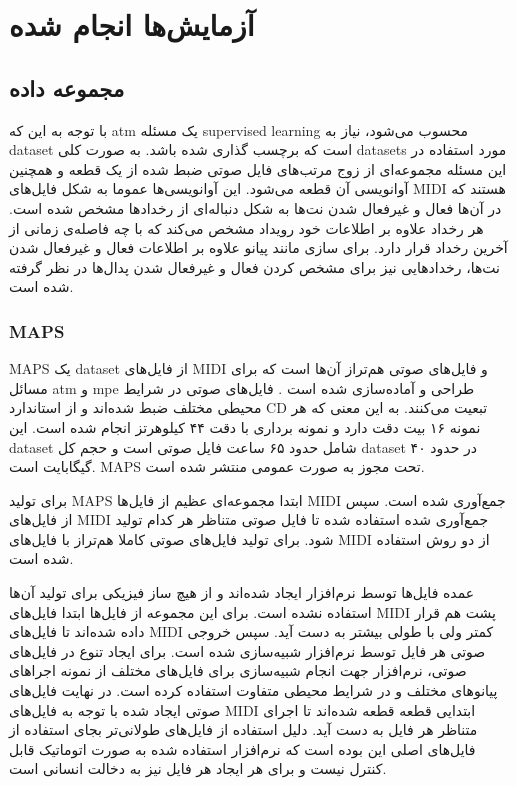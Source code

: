 \chapter{آزمایش‌ها انجام شده}
\section{مجموعه داده}
با توجه به این که \gls{atm} یک مسئله \gls{supervised learning} محسوب می‌شود،
نیاز به \gls{dataset} است که برچسب گذاری شده باشد. به صورت کلی \glspl{dataset}
مورد استفاده در این مسئله مجموعه‌ای از زوج مرتب‌های فایل صوتی ضبط شده از یک قطعه
و همچنین آوانویسی آن قطعه می‌شود. این آوانویسی‌ها عموما به شکل فایل‌های
\gls{MIDI} هستند که در آن‌ها فعال و غیرفعال شدن نت‌ها به شکل دنباله‌ای از
رخدادها مشخص شده است. هر رخداد علاوه بر اطلاعات خود رویداد مشخص می‌کند که با چه
فاصله‌ی زمانی از آخرین رخداد قرار دارد. برای سازی مانند پیانو علاوه بر اطلاعات
فعال و غیرفعال شدن نت‌ها، رخدادهایی نیز برای مشخص کردن فعال و غیرفعال شدن
پدال‌ها در نظر گرفته شده است.

\subsection{MAPS}
MAPS یک \gls{dataset} از فایل‌های \gls{MIDI} و فایل‌های صوتی هم‌تراز آن‌ها است
که برای مسائل \gls{atm} و \gls{mpe} طراحی و آماده‌سازی شده است
\cite{emiya2009multipitch}. فایل‌های صوتی در شرایط محیطی مختلف ضبط شده‌اند و از
استاندارد CD تبعیت می‌کنند. به این معنی که هر نمونه ۱۶ بیت دقت دارد و نمونه
برداری با دقت ۴۴ کیلوهرتز انجام شده است. این \gls{dataset} شامل حدود ۶۵ ساعت
فایل صوتی است و حجم کل \gls{dataset} در حدود ۴۰ گیگابایت است. MAPS تحت مجوز
 به صورت عمومی منتشر شده است.

برای تولید MAPS ابتدا مجموعه‌ای عظیم از فایل‌ها \gls{MIDI} جمع‌آوری شده است. سپس
از فایل‌های \gls{MIDI} جمع‌آوری شده استفاده شده تا فایل صوتی متناظر هر کدام
تولید شود. برای تولید فایل‌های صوتی کاملا هم‌تراز با فایل‌های \gls{MIDI} از دو
روش استفاده شده است.

عمده فایل‌ها توسط نرم‌افزار ایجاد شده‌اند و از هیچ ساز فیزیکی برای تولید آن‌ها
استفاده نشده است. برای این مجموعه از فایل‌ها ابتدا فایل‌های \gls{MIDI} پشت هم
قرار داده شده‌اند تا فایل‌های \gls{MIDI} کمتر ولی با طولی بیشتر به دست آید. سپس
خروجی صوتی هر فایل توسط نرم‌افزار  شبیه‌سازی شده است.
برای ایجاد تنوع در فایل‌های صوتی، نرم‌افزار جهت انجام شبیه‌سازی برای فایل‌های
مختلف از نمونه اجراهای پیانوهای مختلف و در شرایط محیطی متفاوت استفاده کرده است.
در نهایت فایل‌های صوتی ایجاد شده با توجه به فایل‌های \gls{MIDI} ابتدایی قطعه
قطعه شده‌اند تا اجرای متناظر هر فایل به دست آید. دلیل استفاده از فایل‌های
طولانی‌تر بجای استفاده از فایل‌های اصلی این بوده است که نرم‌افزار استفاده شده به
صورت اتوماتیک قابل کنترل نیست و برای هر ایجاد هر فایل نیز به دخالت انسانی است.

